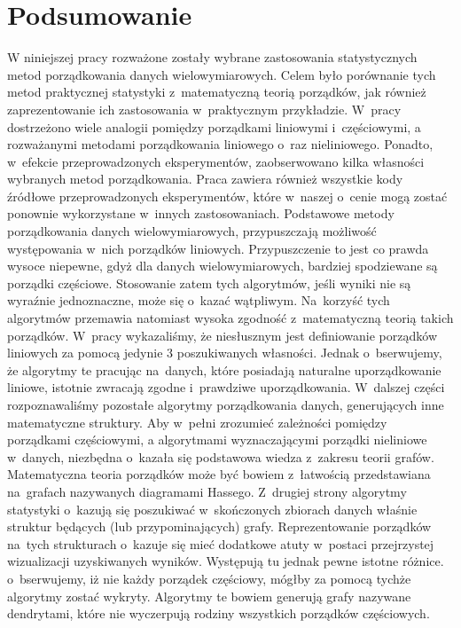 \documentclass[12pt,a4paper]{report}
\begin{document}
\chapter{Podsumowanie}
W niniejszej pracy rozważone zostały wybrane zastosowania statystycznych metod porządkowania danych wielowymiarowych. Celem było porównanie tych metod praktycznej statystyki z~matematyczną teorią porządków, jak również zaprezentowanie ich zastosowania w~praktycznym przykładzie. W~pracy dostrzeżono wiele analogii pomiędzy porządkami liniowymi i~częściowymi, a rozważanymi metodami porządkowania liniowego o~raz nieliniowego. Ponadto, w~efekcie przeprowadzonych eksperymentów, zaobserwowano kilka własności wybranych metod porządkowania. Praca zawiera również wszystkie kody źródłowe przeprowadzonych eksperymentów, które w~naszej o~cenie mogą zostać ponownie wykorzystane w~innych zastosowaniach.
Podstawowe metody porządkowania danych wielowymiarowych, przypuszczają możliwość występowania w~nich porządków liniowych. Przypuszczenie to jest co prawda wysoce niepewne, gdyż dla danych wielowymiarowych, bardziej spodziewane są porządki częściowe. Stosowanie zatem tych algorytmów, jeśli wyniki nie są wyraźnie jednoznaczne, może się o~kazać wątpliwym. Na~korzyść tych algorytmów przemawia natomiast wysoka zgodność z~matematyczną teorią takich porządków. W~pracy wykazaliśmy, że niesłusznym jest definiowanie porządków liniowych za pomocą jedynie 3 poszukiwanych własności. Jednak o~bserwujemy, że algorytmy te pracując na~danych, które posiadają naturalne uporządkowanie liniowe, istotnie zwracają zgodne i~prawdziwe uporządkowania. W~dalszej części rozpoznawaliśmy pozostałe algorytmy porządkowania danych, generujących inne matematyczne struktury.
Aby w~pełni zrozumieć zależności pomiędzy porządkami częściowymi, a algorytmami wyznaczającymi porządki nieliniowe w~danych, niezbędna o~kazała się podstawowa wiedza z~zakresu teorii grafów. Matematyczna teoria porządków może być bowiem z~łatwością przedstawiana na~grafach nazywanych diagramami Hassego. Z~drugiej strony algorytmy statystyki o~kazują się poszukiwać w~skończonych zbiorach danych właśnie struktur będących (lub przypominających) grafy. Reprezentowanie porządków na~tych strukturach o~kazuje się mieć dodatkowe atuty w~postaci przejrzystej wizualizacji uzyskiwanych wyników. Występują tu jednak pewne istotne różnice. o~bserwujemy, iż nie każdy porządek częściowy, mógłby za pomocą tychże algorytmy zostać wykryty. Algorytmy te bowiem generują grafy nazywane dendrytami, które nie wyczerpują rodziny wszystkich porządków częściowych.
\end{document}
